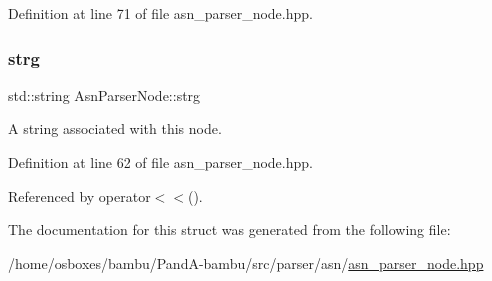 Definition at line 71 of file asn\+\_\+parser\+\_\+node.\+hpp.

\mbox{\label{structAsnParserNode_a433e32c0024310ce541131b87808067c}} 
\subsubsection{\texorpdfstring{strg}{strg}}
{\footnotesize\ttfamily std\+::string Asn\+Parser\+Node\+::strg}



A string associated with this node. 



Definition at line 62 of file asn\+\_\+parser\+\_\+node.\+hpp.



Referenced by operator$<$$<$().



The documentation for this struct was generated from the following file\+:\begin{DoxyCompactItemize}
\item 
/home/osboxes/bambu/\+Pand\+A-\/bambu/src/parser/asn/\hyperlink{asn__parser__node_8hpp}{asn\+\_\+parser\+\_\+node.\+hpp}\end{DoxyCompactItemize}
